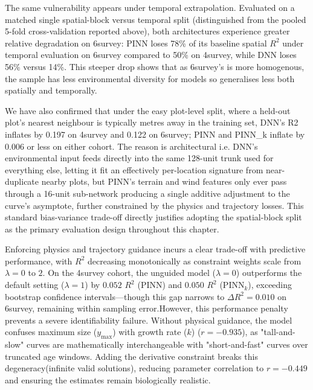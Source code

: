 The same vulnerability appears under temporal extrapolation. Evaluated on a matched single spatial-block versus temporal split (distinguished from the pooled 5-fold cross-validation reported above), both architectures experience greater relative degradation on 6survey: PINN loses 78\% of its baseline spatial $R^2$ under temporal evaluation on 6survey compared to 50\% on 4survey, while DNN loses 56\% versus 14\%. 
This steeper drop shows that as 6survey's is more homogenous, the sample has less environmental diversity for models so generalises less both spatially and temporally.

We have also confirmed that under the easy plot-level split, where a held-out plot's nearest
neighbour is typically metres away in the training set, DNN's R2 inflates by 0.197 on
4survey and 0.122 on 6survey; PINN and PINN\_k inflate by 0.006 or less on either
cohort. The reason is architectural i.e. DNN's environmental input feeds directly into the
same 128-unit trunk used for everything else, letting it fit an effectively
per-location signature from near-duplicate nearby plots, but PINN's terrain and wind
features only ever pass through a 16-unit sub-network producing a single additive
adjustment to the curve's asymptote, further constrained by the physics and trajectory
losses. This standard bias-variance trade-off directly justifies adopting the spatial-block split as the primary evaluation design throughout this chapter.

Enforcing physics and trajectory guidance incurs a clear trade-off with predictive performance, with $R^2$ decreasing monotonically as constraint weights scale from $\lambda = 0$ to $2$. On the 4survey cohort, the unguided model ($\lambda = 0$) outperforms the default setting ($\lambda = 1$) by $0.052$ $R^2$ (PINN) and $0.050$ $R^2$ ($\text{PINN}_k$), exceeding bootstrap confidence intervals—though this gap narrows to $\Delta R^2 = 0.010$ on 6survey, remaining within sampling error.However, this performance penalty prevents a severe identifiability failure. Without physical guidance, the model confuses maximum size ($y_{\max}$) with growth rate ($k$) ($r = -0.935$), as "tall-and-slow" curves are mathematically interchangeable with "short-and-fast" curves over truncated age windows. Adding the derivative constraint breaks this degeneracy(infinite valid solutions), reducing parameter correlation to $r = -0.449$ and ensuring the estimates remain biologically realistic.

